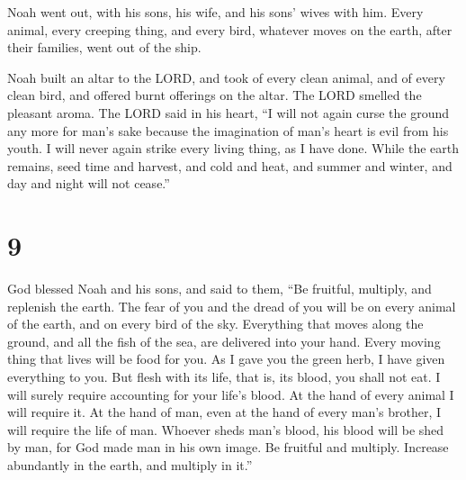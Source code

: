  Noah went out, with his sons, his wife, and his sons'
wives with him.  Every animal, every creeping thing, and
every bird, whatever moves on the earth, after their families, went out
of the ship.

 Noah built an altar to the LORD, and took of every clean
animal, and of every clean bird, and offered burnt offerings on the
altar.  The LORD smelled the pleasant aroma. The LORD
said in his heart, ``I will not again curse the ground any more for
man's sake because the imagination of man's heart is evil from his
youth. I will never again strike every living thing, as I have done.
 While the earth remains, seed time and harvest, and cold
and heat, and summer and winter, and day and night will not cease.''

\hypertarget{section-8}{%
\section{9}\label{section-8}}

 God blessed Noah and his sons, and said to them, ``Be
fruitful, multiply, and replenish the earth.  The fear of
you and the dread of you will be on every animal of the earth, and on
every bird of the sky. Everything that moves along the ground, and all
the fish of the sea, are delivered into your hand.  Every
moving thing that lives will be food for you. As I gave you the green
herb, I have given everything to you.  But flesh with its
life, that is, its blood, you shall not eat.  I will
surely require accounting for your life's blood. At the hand of every
animal I will require it. At the hand of man, even at the hand of every
man's brother, I will require the life of man.  Whoever
sheds man's blood, his blood will be shed by man, for God made man in
his own image.  Be fruitful and multiply. Increase
abundantly in the earth, and multiply in it.''

